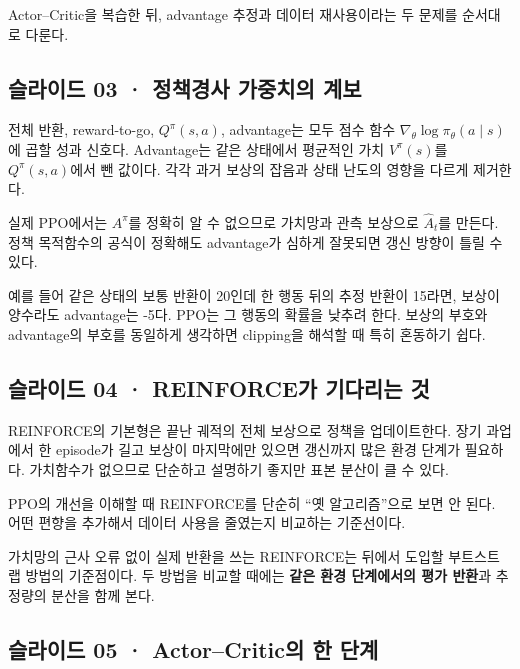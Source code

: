 \documentclass[11pt,a4paper]{article}
\begin{document}
Actor–Critic을 복습한 뒤, advantage 추정과 데이터 재사용이라는 두 문제를 순서대로 다룬다.\par

\subsection{슬라이드 03 · 정책경사 가중치의 계보}

전체 반환, reward-to-go, $Q^\pi(s,a)$, advantage는 모두 점수 함수 $\nabla_\theta\log\pi_\theta(a\mid s)$에 곱할 성과 신호다. Advantage는 같은 상태에서 평균적인 가치 $V^\pi(s)$를 $Q^\pi(s,a)$에서 뺀 값이다. 각각 과거 보상의 잡음과 상태 난도의 영향을 다르게 제거한다.\par

실제 PPO에서는 $A^\pi$를 정확히 알 수 없으므로 가치망과 관측 보상으로 $\widehat A_t$를 만든다. 정책 목적함수의 공식이 정확해도 advantage가 심하게 잘못되면 갱신 방향이 틀릴 수 있다.\par

예를 들어 같은 상태의 보통 반환이 20인데 한 행동 뒤의 추정 반환이 15라면, 보상이 양수라도 advantage는 -5다. PPO는 그 행동의 확률을 낮추려 한다. 보상의 부호와 advantage의 부호를 동일하게 생각하면 clipping을 해석할 때 특히 혼동하기 쉽다.\par

\subsection{슬라이드 04 · REINFORCE가 기다리는 것}

REINFORCE의 기본형은 끝난 궤적의 전체 보상으로 정책을 업데이트한다. 장기 과업에서 한 episode가 길고 보상이 마지막에만 있으면 갱신까지 많은 환경 단계가 필요하다. 가치함수가 없으므로 단순하고 설명하기 좋지만 표본 분산이 클 수 있다.\par

PPO의 개선을 이해할 때 REINFORCE를 단순히 “옛 알고리즘”으로 보면 안 된다. 어떤 편향을 추가해서 데이터 사용을 줄였는지 비교하는 기준선이다.\par

가치망의 근사 오류 없이 실제 반환을 쓰는 REINFORCE는 뒤에서 도입할 부트스트랩 방법의 기준점이다. 두 방법을 비교할 때에는 \textbf{같은 환경 단계에서의 평가 반환}과 추정량의 분산을 함께 본다.\par

\subsection{슬라이드 05 · Actor–Critic의 한 단계}
\end{document}
